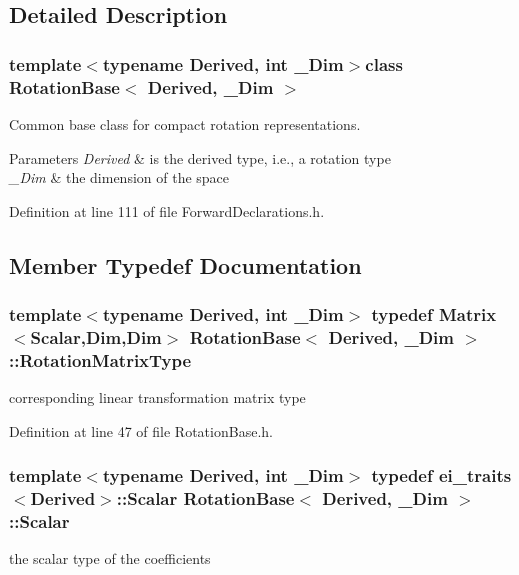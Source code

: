 \subsection{Detailed Description}
\subsubsection*{template$<$typename Derived, int \-\_\-\-Dim$>$class Rotation\-Base$<$ Derived, \-\_\-\-Dim $>$}

Common base class for compact rotation representations. 


\begin{DoxyParams}{Parameters}
{\em Derived} & is the derived type, i.\-e., a rotation type \\
\hline
{\em \-\_\-\-Dim} & the dimension of the space \\
\hline
\end{DoxyParams}


Definition at line 111 of file Forward\-Declarations.\-h.



\subsection{Member Typedef Documentation}
\hypertarget{class_rotation_base_a0f1d2a93b35fbb954e587ab655d68d31}{
\subsubsection[{Rotation\-Matrix\-Type}]{\setlength{\rightskip}{0pt plus 5cm}template$<$typename Derived, int \-\_\-\-Dim$>$ typedef {\bf Matrix}$<${\bf Scalar},{\bf Dim},{\bf Dim}$>$ {\bf Rotation\-Base}$<$ Derived, \-\_\-\-Dim $>$\-::{\bf Rotation\-Matrix\-Type}}}\label{class_rotation_base_a0f1d2a93b35fbb954e587ab655d68d31}
corresponding linear transformation matrix type 

Definition at line 47 of file Rotation\-Base.\-h.

\hypertarget{class_rotation_base_ae9cbe0a3a87dfe2fa70958d9fe948a09}{
\subsubsection[{Scalar}]{\setlength{\rightskip}{0pt plus 5cm}template$<$typename Derived, int \-\_\-\-Dim$>$ typedef {\bf ei\-\_\-traits}$<$Derived$>$\-::{\bf Scalar} {\bf Rotation\-Base}$<$ Derived, \-\_\-\-Dim $>$\-::{\bf Scalar}}}\label{class_rotation_base_ae9cbe0a3a87dfe2fa70958d9fe948a09}
the scalar type of the coefficients 

